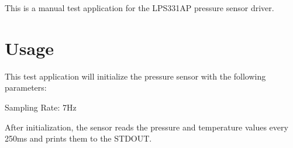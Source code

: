 This is a manual test application for the L\+P\+S331\+AP pressure sensor driver.

\section*{Usage}

This test application will initialize the pressure sensor with the following parameters\+:
\begin{DoxyItemize}
\item Sampling Rate\+: 7\+Hz
\end{DoxyItemize}

After initialization, the sensor reads the pressure and temperature values every 250ms and prints them to the S\+T\+D\+O\+UT. 